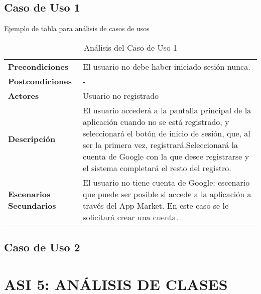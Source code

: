 \subsection{Caso de Uso 1} 

\textcolor[rgb]{0.65,0.16,0}{Ejemplo de tabla para análisis de casos de usos}

\begin{table}[H]
  \centering
  \vspace{-5mm}
  \caption{Análisis del Caso de Uso 1}
    \begin{tabular}{p{7.5em}p{24.145em}}
    \toprule
    \rowcolor[rgb]{ .871,  .918,  .965} \multicolumn{2}{p{31.645em}}{\textbf{Registro}} \\
    \midrule
    \rowcolor[rgb]{ .906,  .902,  .902} \textbf{Precondiciones} & \cellcolor[rgb]{ 1,  1,  1}El usuario no debe haber iniciado sesión nunca. \\
    \midrule
    \rowcolor[rgb]{ .906,  .902,  .902} \textbf{Postcondiciones} & \cellcolor[rgb]{ 1,  1,  1}- \\
    \midrule
    \rowcolor[rgb]{ .906,  .902,  .902} \textbf{Actores} & \cellcolor[rgb]{ 1,  1,  1}Usuario no registrado \\
    \midrule
    \rowcolor[rgb]{ .906,  .902,  .902} \textbf{Descripción} & \cellcolor[rgb]{ 1,  1,  1}El usuario accederá a la pantalla principal de la aplicación cuando no se está registrado, y seleccionará el botón de inicio de sesión, que, al ser la primera vez, registrará.Seleccionará la cuenta de Google con la que desee registrarse y el sistema completará el resto del registro. \\
    \midrule
    \rowcolor[rgb]{ .906,  .902,  .902} \textbf{Escenarios          Secundarios} & \cellcolor[rgb]{ 1,  1,  1} El usuario no tiene cuenta de Google: escenario que puede ser posible si accede a la aplicación a través del App Market. En este caso se le solicitará crear una cuenta. \\
    \bottomrule
    \end{tabular}%
\end{table}%
 
\subsection{Caso de Uso 2}


\newpage
\section{ASI 5: ANÁLISIS DE CLASES}

